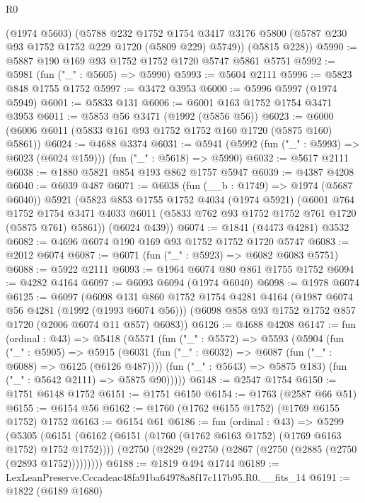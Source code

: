 \begin{lexlean}{R0}
\begin{coremodule}
      (@1974 @5603)
      (@5788
        @232
        @1752
        @1754
        @3417
        @3176
        @5800
        (@5787 @230 @93 @1752 @1752 @229 @1720 (@5809 @229) @5749))
      (@5815 @228))
@5990 := @5887 @190 @169 @93 @1752 @1752 @1720 @5747 @5861 @5751
@5992 := @5981 (fun ("_" : @5605) => @5990)
@5993 := @5604 @2111
@5996 := @5823 @848 @1755 @1752
@5997 := @3472 @3953
@6000 := @5996 @5997 (@1974 @5949)
@6001 := @5833 @131
@6006 := @6001 @163 @1752 @1754 @3471 @3953
@6011 := @5853 @56 @3471 (@1992 (@5856 @56))
@6023 := @6000 (@6006 @6011 (@5833 @161 @93 @1752 @1752 @160 @1720 (@5875 @160) @5861))
@6024 := @4688 @3374
@6031 := @5941 (@5992 (fun ("_" : @5993) => @6023 (@6024 @159))) (fun ("_" : @5618) => @5990)
@6032 := @5617 @2111
@6038 := @1880 @5821 @854 @193 @862 @1757 @5947
@6039 := @4387 @4208
@6040 := @6039 @487
@6071 := @6038
    (fun (__b : @1749) => @1974 (@5687 @6040))
    @5921
    (@5823
      @853
      @1755
      @1752
      @4034
      (@1974 @5921)
      (@6001
        @764
        @1752
        @1754
        @3471
        @4033
        @6011
        (@5833 @762 @93 @1752 @1752 @761 @1720 (@5875 @761) @5861))
      (@6024 @439))
@6074 := @1841 (@4473 @4281) @3532
@6082 := @4696 @6074 @190 @169 @93 @1752 @1752 @1720 @5747
@6083 := @2012 @6074
@6087 := @6071 (fun ("_" : @5923) => @6082 @6083 @5751)
@6088 := @5922 @2111
@6093 := @1964 @6074 @80 @861 @1755 @1752
@6094 := @4282 @4164
@6097 := @6093 @6094 (@1974 @6040)
@6098 := @1978 @6074
@6125 := @6097
    (@6098
      @131
      @860
      @1752
      @1754
      @4281
      @4164
      (@1987 @6074 @56 @4281 (@1992 (@1993 @6074 @56)))
      (@6098 @858 @93 @1752 @1752 @857 @1720 (@2006 @6074 @11 @857) @6083))
@6126 := @4688 @4208
@6147 := fun (ordinal : @43) =>
  @5418
    (@5571
      (fun ("_" : @5572) =>
      @5593
        (@5904
          (fun ("_" : @5905) =>
          @5915
            (@6031 (fun ("_" : @6032) => @6087 (fun ("_" : @6088) => @6125 (@6126 @487))))
            (fun ("_" : @5643) => @5875 @183)
            (fun ("_" : @5642 @2111) => @5875 @90)))))
@6148 := @2547 @1754
@6150 := @1751 @6148 @1752
@6151 := @1751 @6150
@6154 := @1763 (@2587 @66 @51)
@6155 := @6154 @56
@6162 := @1760 (@1762 @6155 @1752) (@1769 @6155 @1752) @1752
@6163 := @6154 @61
@6186 := fun (ordinal : @43) =>
  @5299
    (@5305
      (@6151 (@6162 (@6151 (@1760 (@1762 @6163 @1752) (@1769 @6163 @1752) @1752 @1752))))
      (@2750 (@2829 (@2750 (@2867 (@2750 (@2885 (@2750 (@2893 @1752)))))))))
@6188 := @1819 @494 @1744
@6189 := LexLeanPreserve.Cccadeac48fa91ba64978a8f17c117b95.R0.__fits_14
@6191 := @1822 (@6189 @1680)

\end{coremodule}
\end{lexlean}
